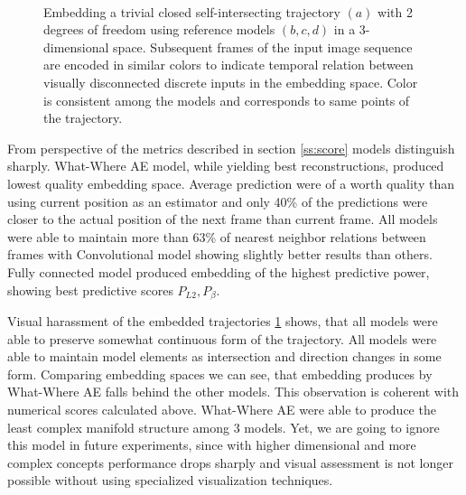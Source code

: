\begin{figure}[t!]
	\centering
	\\
    	\caption{Embedding a trivial closed self-intersecting trajectory $(a)$ with 2 degrees of freedom using reference models $(b, c, d)$ in a 3-dimensional space. Subsequent frames of the input image sequence are encoded in similar colors to indicate temporal relation between visually disconnected discrete inputs in the embedding space. Color is consistent among the models and corresponds to same points of the trajectory.}
    	\label{fig:model_reco}
\end{figure}

From perspective of the metrics described in section \ref{ss:score} models distinguish sharply. What-Where AE model, while yielding best reconstructions, produced lowest quality embedding space. Average prediction were of a worth quality than using current position as an estimator and only 40\% of the predictions were closer to the actual position of the next frame than current frame. All models were able to maintain more than 63\% of nearest neighbor relations between frames with Convolutional model showing slightly better results than others. Fully connected model produced embedding of the highest predictive power, showing best predictive scores $P_{L2}, P_{\beta}$.

Visual harassment of the embedded trajectories \ref{fig:model_reco} shows, that all models were able to preserve somewhat continuous form of the trajectory. All models were able to maintain model elements as intersection and direction changes in some form. Comparing embedding spaces we can see, that embedding produces by What-Where AE falls behind the other models. This observation is coherent with numerical scores calculated above. What-Where AE were able to produce the least complex manifold structure among 3 models. Yet, we are going to ignore this model in future experiments, since with higher dimensional and more complex concepts performance drops sharply and visual assessment is not longer possible without using specialized visualization techniques.

